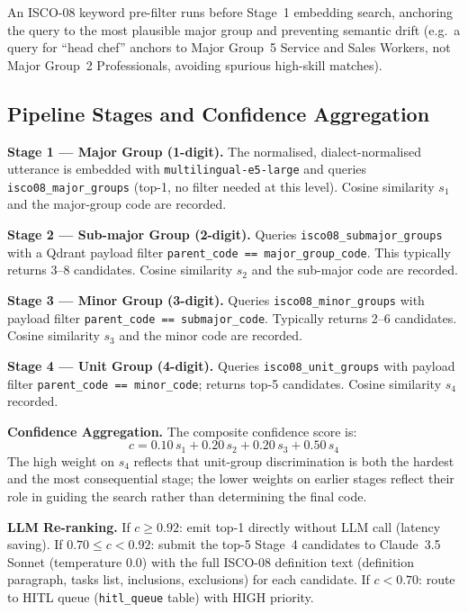 An ISCO-08 keyword pre-filter runs before Stage~1 embedding search, anchoring
the query to the most plausible major group and preventing semantic drift
(e.g.\ a query for ``head chef'' anchors to Major Group~5 Service and Sales
Workers, not Major Group~2 Professionals, avoiding spurious high-skill matches).

\subsection{Pipeline Stages and Confidence Aggregation}

\textbf{Stage 1 --- Major Group (1-digit).}
The normalised, dialect-normalised utterance is embedded with
\texttt{multilingual-e5-large} and queries \texttt{isco08\_major\_groups}
(top-1, no filter needed at this level).
Cosine similarity $s_1$ and the major-group code are recorded.

\textbf{Stage 2 --- Sub-major Group (2-digit).}
Queries \texttt{isco08\_submajor\_groups} with a Qdrant payload filter
\texttt{parent\_\-code == major\_\-group\_\-code}.
This typically returns 3--8 candidates.
Cosine similarity $s_2$ and the sub-major code are recorded.

\textbf{Stage 3 --- Minor Group (3-digit).}
Queries \texttt{isco08\_minor\_groups} with payload filter
\texttt{parent\_\-code == submajor\_\-code}.
Typically returns 2--6 candidates.
Cosine similarity $s_3$ and the minor code are recorded.

\textbf{Stage 4 --- Unit Group (4-digit).}
Queries \texttt{isco08\_unit\_groups} with payload filter
\texttt{parent\_\-code == minor\_\-code}; returns top-5 candidates.
Cosine similarity $s_4$ recorded.

\textbf{Confidence Aggregation.}
The composite confidence score is:
\begin{equation}
  c = 0.10\,s_1 + 0.20\,s_2 + 0.20\,s_3 + 0.50\,s_4
  \label{eq:confidence}
\end{equation}
The high weight on $s_4$ reflects that unit-group discrimination is both the
hardest and the most consequential stage; the lower weights on earlier stages
reflect their role in guiding the search rather than determining the final code.

\textbf{LLM Re-ranking.}
If $c \geq 0.92$: emit top-1 directly without LLM call (latency saving).
If $0.70 \leq c < 0.92$: submit the top-5 Stage~4 candidates to Claude~3.5
Sonnet (temperature 0.0) with the full ISCO-08 definition text (definition
paragraph, tasks list, inclusions, exclusions) for each candidate.
If $c < 0.70$: route to HITL queue (\texttt{hitl\_queue} table) with HIGH
priority.

